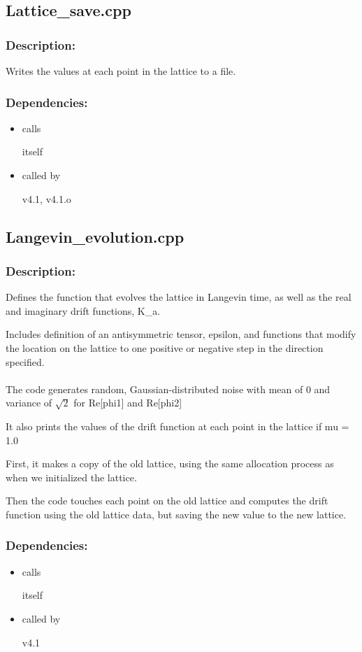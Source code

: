 \subsection{Lattice\_save.cpp}
\subsubsection{Description:}
Writes the values at each point in the lattice to a file.

\subsubsection{Dependencies:}
\begin{itemize}
\item calls 

itself

\item called by

v4.1, v4.1.o

\end{itemize}

\subsection{Langevin\_evolution.cpp}
\subsubsection{Description:}
Defines the function that evolves the lattice in Langevin time, as well as the real and imaginary
drift functions, K\_a.

Includes definition of an antisymmetric tensor, epsilon, and functions that modify the location 
on the lattice to one positive or negative step in the direction specified.\\
\\
The code generates random, Gaussian-distributed noise with mean of 0 and variance of $\sqrt{2}$ for Re[phi1] and Re[phi2]

It also prints the values of the drift function at each point in the lattice if mu = 1.0

First, it makes a copy of the old lattice, using the same allocation process as when we initialized the lattice.

Then the code touches each point on the old lattice and computes the drift function using the old lattice data, but saving the new value to the new lattice.

\subsubsection{Dependencies:}
\begin{itemize}
\item calls 

itself

\item called by

v4.1

\end{itemize}

